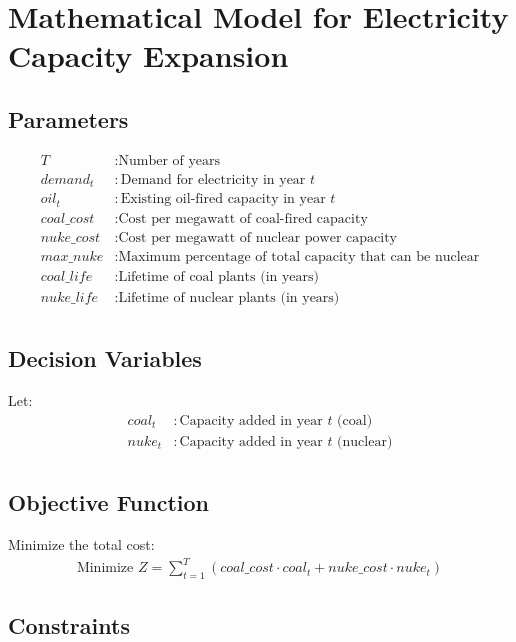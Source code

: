 \documentclass{article}
\begin{document}
\section*{Mathematical Model for Electricity Capacity Expansion}

\subsection*{Parameters}
\begin{align*}
T & : \text{Number of years} \\
demand_t & : \text{Demand for electricity in year } t \\
oil_t & : \text{Existing oil-fired capacity in year } t \\
coal\_cost & : \text{Cost per megawatt of coal-fired capacity} \\
nuke\_cost & : \text{Cost per megawatt of nuclear power capacity} \\
max\_nuke & : \text{Maximum percentage of total capacity that can be nuclear} \\
coal\_life & : \text{Lifetime of coal plants (in years)} \\
nuke\_life & : \text{Lifetime of nuclear plants (in years)} \\
\end{align*}

\subsection*{Decision Variables}
Let:
\begin{align*}
coal_t & : \text{Capacity added in year } t \text{ (coal)} \\
nuke_t & : \text{Capacity added in year } t \text{ (nuclear)} \\
\end{align*}

\subsection*{Objective Function}
Minimize the total cost:
\begin{align*}
\text{Minimize } Z = \sum_{t=1}^{T} (coal\_cost \cdot coal_t + nuke\_cost \cdot nuke_t)
\end{align*}

\subsection*{Constraints}
\end{document}
